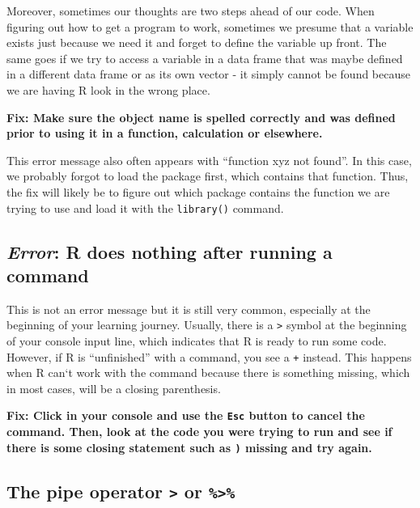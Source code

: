 \documentclass[
]{book}
\begin{document}
Moreover, sometimes our thoughts are two steps ahead of our code.
When figuring out how to get a program to work, sometimes we presume that a variable exists just because we need it and forget to define the variable up front.
The same goes if we try to access a variable in a data frame that was maybe defined in a different data frame or as its own vector - it simply cannot be found because we are having R look in the wrong place.

\textbf{Fix: Make sure the object name is spelled correctly and was defined prior to using it in a function, calculation or elsewhere.}

This error message also often appears with ``function xyz not found''.
In this case, we probably forgot to load the package first, which contains that function.
Thus, the fix will likely be to figure out which package contains the function we are trying to use and load it with the \texttt{library()} command.

\subsection*{\texorpdfstring{\emph{Error}: R does nothing after running a command}{Error: R does nothing after running a command}}\label{error-r-does-nothing-after-running-a-command}

This is not an error message but it is still very common, especially at the beginning of your learning journey.
Usually, there is a \texttt{\textgreater{}} symbol at the beginning of your console input line, which indicates that R is ready to run some code.
However, if R is ``unfinished'' with a command, you see a \texttt{+} instead.
This happens when R can`t work with the command because there is something missing, which in most cases, will be a closing parenthesis.

\textbf{Fix: Click in your console and use the \texttt{Esc} button to cancel the command. Then, look at the code you were trying to run and see if there is some closing statement such as \texttt{)} missing and try again.}

\subsection*{\texorpdfstring{The pipe operator \texttt{\textbar{}\textgreater{}} or \texttt{\%\textgreater{}\%}}{The pipe operator \textbar\textgreater{} or \%\textgreater\%}}\label{pipe}
\end{document}
